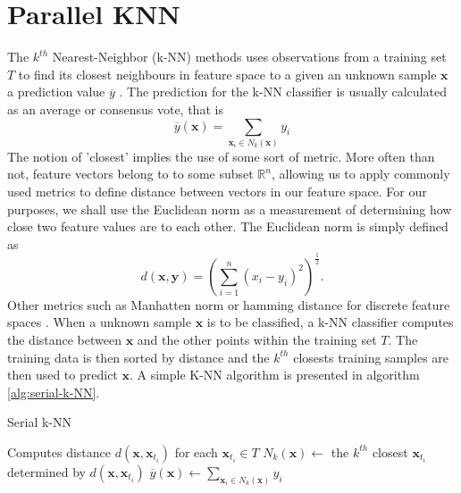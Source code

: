 \section{Parallel KNN}
The $k^{th}$ Nearest-Neighbor (k-NN) methods uses observations from a training set $T$ to find its closest neighbours in feature space to a given an unknown sample $\bm{x}$ a prediction value $\overline{y}$ \cite{HastieTrevor2009EoSL}. The prediction for the k-NN classifier is usually calculated as an average or consensus vote, that is
\[
    \overline{y} \left( \bm{x} \right) = \sum_{\bm{x}_{i} \in N_{k} (\bm{x})} y_{i}
\]
The notion of 'closest' implies the use of some sort of metric. More often than not, feature vectors belong to to some subset $\mathbb{R}^{n}$, allowing us to apply commonly used metrics to define distance between vectors in our feature space. For our purposes, we shall use the Euclidean norm as a measurement of determining how close two feature values are to each other. The Euclidean norm is simply defined as
\[
    d \left( \bm{x}, \bm{y} \right) = \left( \sum_{i=1}^{n} \left( x_{i} - y_{i} \right)^{2} \right)^{\frac{1}{2}}.
\]
Other metrics such as Manhatten norm or hamming distance for discrete feature spaces \cite{HastieTrevor2009EoSL}. When a unknown sample $\bm{x}$ is to be classified, a k-NN classifier computes the distance between $\bm{x}$ and the other points within the training set $T$. The training data is then sorted by distance and the $k^{th}$ closests training samples are then used to predict $\bm{x}$. A simple K-NN algorithm is presented in algorithm \ref{alg:serial-k-NN}.
\begin{algorithm}[ht!!!]
\caption{Serial k-NN}
\label{alg:serial-k-NN}
\SetAlgoLined
    
    \BlankLine
    Computes distance $d \left( \bm{x}, \bm{x}_{t_i} \right)$ for each $\bm{x}_{t_i} \in T$\;
    $N_{k} (\bm{x}) \gets$ the $k^{th}$ closest $\bm{x}_{t_i}$ determined by $d \left( \bm{x}, \bm{x}_{t_i} \right)$\;
    $\overline{y} \left( \bm{x} \right) \gets \sum_{\bm{x}_{i} \in N_{k} (\bm{x})} y_{i}$\;
    \BlankLine
\end{algorithm}
